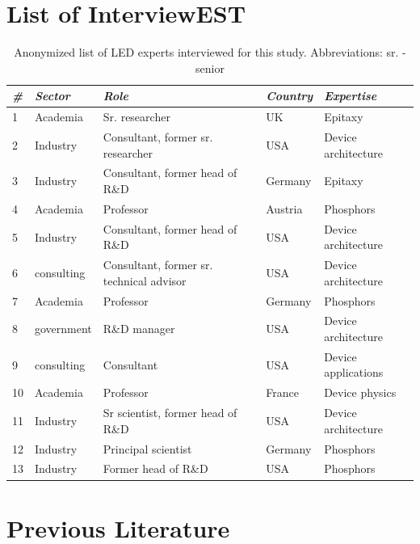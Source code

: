 \documentclass[10pt]{article}
\begin{document}
\begin{figure}[H]
\label{fig:phosphor_spectrum}
\end{figure}

\section{List of InterviewEST}

\begin{table}[h!]
\small
    \centering
    \caption{Anonymized list of LED experts interviewed for this study. Abbreviations: sr. - senior}
    \vspace{5mm}
    \begin{tabular}{|l|l|l|l|l|}
    \hline
        \textit{\#} & \textit{Sector} & \textit{Role} & \textit{Country} & \textit{Expertise} \\ \hline
        1 & Academia & Sr. researcher & UK & Epitaxy \\ \hline
        2 & Industry & Consultant, former sr. researcher & USA & Device architecture \\ \hline
        3 & Industry & Consultant, former head of R\&D & Germany & Epitaxy \\ \hline
        4 & Academia & Professor & Austria & Phosphors \\ \hline
        5 & Industry & Consultant, former head of R\&D & USA & Device architecture \\ \hline
        6 & consulting & Consultant, former sr. technical advisor & USA & Device architecture \\ \hline
        7 & Academia & Professor & Germany & Phosphors \\ \hline
        8 & government & R\&D manager & USA & Device architecture \\ \hline
        9 & consulting & Consultant & USA & Device applications \\ \hline
        10 & Academia & Professor & France & Device physics \\ \hline
        11 & Industry & Sr scientist, former head of R\&D & USA & Device architecture \\ \hline
        12 & Industry & Principal scientist & Germany & Phosphors \\ \hline
        13 & Industry & Former head of R\&D & USA & Phosphors \\ \hline
    \end{tabular}
    \label{tab:interviews}
\end{table}

\clearpage
\section{Previous Literature}
\label{sec:prev_lit}
\end{document}
